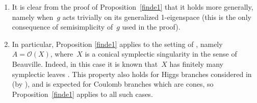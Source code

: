 \begin{Remark} \quad
\begin{enumerate}\itemsep=0pt
\item It is clear from the proof of Proposition~\ref{finde1} that it holds more generally, namely when~$g$ acts trivially on its generalized 1-eigenspace (this is the only consequence of semisimplicity of~$g$ used in the proof).
\item In particular, Proposition \ref{finde1} applies to the setting of \cite{L2}, namely $A=\mathcal{O}(X)$, where~$X$ is a conical symplectic singularity in the sense of Beauville. Indeed, in this case it is known that~$X$ has finitely many symplectic leaves \cite[Theorem~2.3]{Ka}. This property also holds for Higgs branches considered in~\cite{BPR} (by \cite[Section~2.3]{L3}), and is expected for Coulomb branches which are cones, so Proposition~\ref{finde1} applies to all such cases.
\end{enumerate}
\end{Remark}
